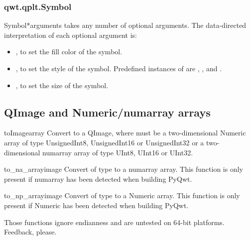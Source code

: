 \documentclass{manual}
\begin{document}
\subsubsection{qwt.qplt.Symbol \label{intro-qplt-symbol}}

\begin{classdesc}{Symbol}{*arguments}
   takes any number of optional arguments.
  The data-directed interpretation of each optional argument is:
  \begin{itemize}
  \item
    , to set the fill color of the symbol.
  \item
    , to set the style of the symbol. Predefined instances
    of  are , ,
     and .
  \item
    , to set the size of the symbol.
  \end{itemize}
\end{classdesc}

\subsection{QImage and Numeric/numarray arrays \label{qwt-qimage}}

\begin{funcdesc}{toImage}{array}
  Convert  to a QImage, where  must be a two-dimensional
  Numeric array of type UnsignedInt8, UnsignedInt16 or UnsignedInt32 or a
  two-dimensional numarray array of type UInt8, UInt16 or UInt32.
\end{funcdesc}

\begin{funcdesc}{to_na_array}{image}
  Convert  of type  to a numarray array. This function
  is only present if numarray has been detected when building PyQwt.
\end{funcdesc}

\begin{funcdesc}{to_np_array}{image}
  Convert  of type  to a Numeric array. This function
  is only present if Numeric has been detected when building PyQwt.
\end{funcdesc}

\begin{notice}[warning]
Those functions ignore endianness and are untested on 64-bit platforms.
Feedback, please.
\end{notice}
\end{document}
